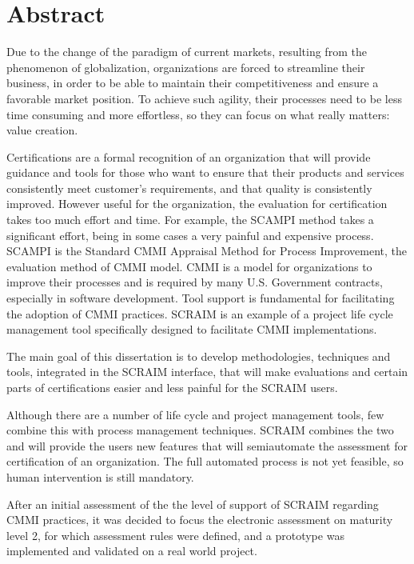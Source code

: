 \chapter*{Abstract}

Due to the change of the paradigm of current markets, resulting from the phenomenon of globalization, organizations are forced to streamline their business, in order to be able to maintain their competitiveness and ensure a favorable market position. To achieve such agility, their processes need to be less time consuming and more effortless, so they can focus on what really matters: value creation.

Certifications are a formal recognition of an organization that will provide guidance and tools for those who want to ensure that their products and services consistently meet customer's requirements, and that quality is consistently improved. However useful for the organization, the evaluation for certification takes too much effort and time. For example, the SCAMPI method takes a significant effort, being in some cases a very painful and expensive process. SCAMPI is the Standard CMMI Appraisal Method for Process Improvement, the evaluation method of CMMI model. CMMI is a model for organizations to improve their processes and is required by many U.S. Government contracts, especially in software development. 
Tool support is fundamental for facilitating the adoption of CMMI practices. SCRAIM is an example of a project life cycle management tool specifically designed to facilitate CMMI implementations.

The main goal of this dissertation is to develop methodologies, techniques and tools, integrated in the SCRAIM interface, that will make evaluations and certain parts of certifications easier and less painful for the SCRAIM users.

Although there are a number of life cycle and project management tools, few combine this with process management techniques. SCRAIM combines the two and will provide the users new features that will semiautomate the assessment for certification of an organization. The full automated process is not yet feasible, so human intervention is still mandatory. 

After an initial assessment of the the level of support of SCRAIM regarding CMMI practices, it was decided to focus the electronic assessment on maturity level 2, for which assessment rules were defined, and a prototype was implemented and validated on a real world project.

